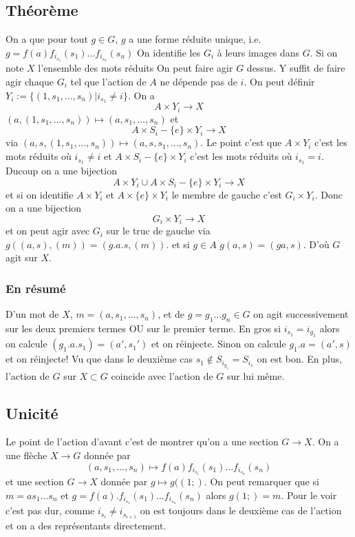 \documentclass[a4paper,12pt]{book}
\theoremstyle{plain}
\theoremstyle{definition}
\theoremstyle{remark}
\begin{document}
\subsection{Théorème}
On a que pour tout $g\in G$, $g$ a une forme réduite unique, i.e. 
$g=f(a)f_{i_{s_1}}(s_1)\ldots f_{i_{s_n}}(s_n)$
On identifie les $G_i$ à leurs images dans $G$. Si on note
$X$ l'ensemble des mots réduits 
On peut faire agir $G$ dessus. Y suffit de faire agir chaque
$G_i$ tel que l'action de $A$ ne dépende pas de $i$. On peut 
définir $Y_i:=\{(1,s_1,\ldots,s_n)|i_{s_1}\ne i\}$. On a 
\[A\times Y_i\to X\]
$(a,(1,s_1,\ldots,s_n))\mapsto (a,s_1,\ldots,s_n)$ et
\[A\times S_i-\{e\}\times Y_i\to X\]
via $(a,s,(1,s_1,\ldots,s_n))\mapsto (a,s,s_1,\ldots,s_n)$.
Le point c'est que $A\times Y_i$ c'est les mots réduits où
$i_{s_1}\ne i$ et $A\times S_i-\{e\}\times Y_i$ c'est les mots
réduits où $i_{s_1}=i$. Ducoup on a une bijection
\[A\times Y_i\cup A\times S_i-\{e\}\times Y_i\to X\]
et si on identifie $A\times Y_i$ et $A\times \{e\}\times Y_i$
le membre de gauche c'est $G_i\times Y_i$. Donc on a une bijection
\[G_i\times Y_i\to X\]
et on peut agir avec $G_i$ sur le truc de gauche via 
$g((a,s), (m))=(g.a.s,(m))$.
et si $g\in A$ $g(a,s)=(ga,s)$. D'où $G$ agit sur $X$.
\subsubsection{En résumé}
D'un mot de $X$, $m=(a,s_1,\ldots, s_n)$, et de 
$g=g_1\ldots g_n\in G$ on agit successivement sur les deux
premiers termes OU sur le premier terme. En gros si 
$i_{s_1}=i_{g_1}$ alors on calcule $(g_1.a.s_1)=(a',s_1')$ et
on réinjecte. Sinon on calcule $g_1.a=(a',s)$ et on réinjecte!
Vu que dans le deuxième cas $s_1\notin S_{i_{g_1}}=S_{i_s}$
on est bon. En plus, l'action de $G$ sur $X\subset G$ coincide
avec l'action de $G$ sur lui même. 

\subsection{Unicité}
Le point de l'action d'avant c'est de montrer qu'on a une section
$G\to X$. On a une flèche $X\to G$ donnée par 
\[(a,s_1,\ldots,s_n)\mapsto f(a)f_{i_{s_1}}(s_1)\ldots f_{i_{s_n}}(s_n)\]
et une section $G\to X$ donnée par $g\mapsto g((1;)$. 
On peut remarquer que si $m=as_1\ldots s_n$ et 
$g=f(a).f_{i_{s_1}}(s_1)\ldots f_{i_{s_n}}(s_n)$ alors $g(1;)=m$.
Pour le voir c'est pas dur, comme $i_{s_i}\ne i_{s_{i+1}}$
on est toujours dans le deuxième cas de l'action et on a des
représentants directement. 
\end{document}
